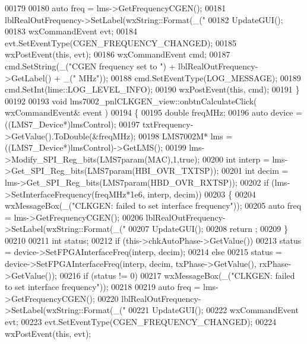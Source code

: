 \begin{DoxyCode}
{{{{{{00179 
00180     \textcolor{keyword}{auto} freq = lms->GetFrequencyCGEN();
00181     lblRealOutFrequency->SetLabel(wxString::Format(\_(\textcolor{stringliteral}{"%
00182     UpdateGUI();
00183     wxCommandEvent evt;
00184     evt.SetEventType(CGEN\_FREQUENCY\_CHANGED);
00185     wxPostEvent(\textcolor{keyword}{this}, evt);
00186     wxCommandEvent cmd;
00187     cmd.SetString(\_(\textcolor{stringliteral}{"CGEN frequency set to "}) + lblRealOutFrequency->GetLabel() + \_(\textcolor{stringliteral}{" MHz"}));
00188     cmd.SetEventType(LOG\_MESSAGE);
00189     cmd.SetInt(lime::LOG_LEVEL_INFO);
00190     wxPostEvent(\textcolor{keyword}{this}, cmd);
00191 \}
00192 
00193 \textcolor{keywordtype}{void} lms7002_pnlCLKGEN_view::onbtnCalculateClick( wxCommandEvent& event )
00194 \{
00195     \textcolor{keywordtype}{double} freqMHz;
00196     \textcolor{keyword}{auto} device = ((LMS7_Device*)lmsControl);
00197     txtFrequency->GetValue().ToDouble(&freqMHz);
00198     LMS7002M* lms = ((LMS7_Device*)lmsControl)->GetLMS();
00199     lms->Modify_SPI_Reg_bits(LMS7param(MAC),1,\textcolor{keyword}{true});
00200     \textcolor{keywordtype}{int} interp = lms->Get_SPI_Reg_bits(LMS7param(HBI_OVR_TXTSP));
00201     \textcolor{keywordtype}{int} decim = lms->Get_SPI_Reg_bits(LMS7param(HBD_OVR_RXTSP));
00202     \textcolor{keywordflow}{if} (lms->SetInterfaceFrequency(freqMHz*1e6, interp, decim))
00203     \{
00204         wxMessageBox(\_(\textcolor{stringliteral}{"CLKGEN: failed to set interface frequency"}));
00205         \textcolor{keyword}{auto} freq = lms->GetFrequencyCGEN();
00206         lblRealOutFrequency->SetLabel(wxString::Format(\_(\textcolor{stringliteral}{"%
00207         UpdateGUI();
00208         return ;
00209     \}
00210 
00211     \textcolor{keywordtype}{int} status;
00212     \textcolor{keywordflow}{if} (this->chkAutoPhase->GetValue())
00213         status = device->SetFPGAInterfaceFreq(interp, decim);
00214     \textcolor{keywordflow}{else}
00215         status = device->SetFPGAInterfaceFreq(interp, decim, txPhase->GetValue(), 
      rxPhase->GetValue());
00216     \textcolor{keywordflow}{if} (status != 0)
00217         wxMessageBox(\_(\textcolor{stringliteral}{"CLKGEN: failed to set interface frequency"}));
00218 
00219     \textcolor{keyword}{auto} freq = lms->GetFrequencyCGEN();
00220     lblRealOutFrequency->SetLabel(wxString::Format(\_(\textcolor{stringliteral}{"%
00221     UpdateGUI();
00222     wxCommandEvent evt;
00223     evt.SetEventType(CGEN\_FREQUENCY\_CHANGED);
00224     wxPostEvent(\textcolor{keyword}{this}, evt);
}}}}}}}}}
\end{DoxyCode}
